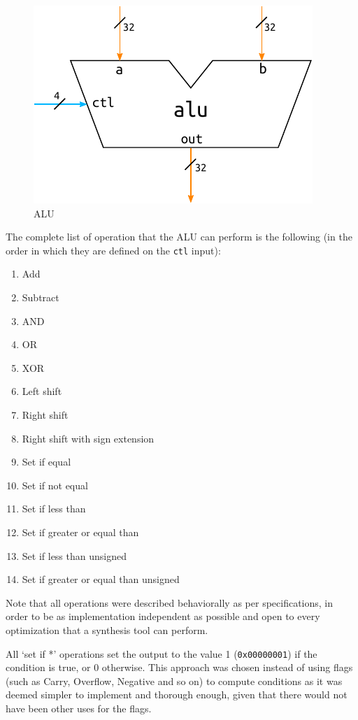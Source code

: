\documentclass[a4paper]{article}
\begin{document}
\begin{figure}[hbtp]
    \centering
    \includegraphics[]{../alu/ref/schematic/alu.pdf}
    \caption{ALU}
    \label{fig:alu}
\end{figure}

The complete list of operation that the ALU can perform is the following (in the order in which they are defined on the \texttt{ctl} input):
\begin{enumerate}
    \item Add
    \item Subtract
    \item AND 
    \item OR 
    \item XOR 
    \item Left shift
    \item Right shift
    \item Right shift with sign extension
    \item Set if equal
    \item Set if not equal
    \item Set if less than
    \item Set if greater or equal than
    \item Set if less than unsigned
    \item Set if greater or equal than unsigned
\end{enumerate}

Note that all operations were described behaviorally as per specifications, in order to be as implementation independent as possible and open to every optimization that a synthesis tool can perform.

All `set if *' operations set the output to the value 1 (\texttt{0x00000001}) if the condition is true, or 0 otherwise. This approach was chosen instead of using flags (such as Carry, Overflow, Negative and so on) to compute conditions as it was deemed simpler to implement and thorough enough, given that there would not have been other uses for the flags.
\end{document}
